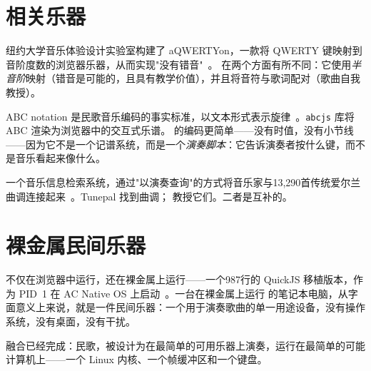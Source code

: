 \documentclass[11pt]{article}
\begin{document}
\section{相关乐器}

\begin{card}
纽约大学音乐体验设计实验室构建了 aQWERTYon，一款将 QWERTY 键映射到音阶度数的浏览器乐器，从而实现"没有错音"~\citep{hein2017aqwertyon}。\np{} 在两个方面有所不同：它使用\emph{半音阶}映射（错音是可能的，且具有教学价值），并且将音符与歌词配对（歌曲自我教授）。
\end{card}

\begin{card}
ABC notation 是民歌音乐编码的事实标准，以文本形式表示旋律~\citep{walshaw2011abc}。\texttt{abcjs} 库将 ABC 渲染为浏览器中的交互式乐谱。\np{} 的编码更简单——没有时值，没有小节线——因为它不是一个记谱系统，而是一个\emph{演奏脚本}：它告诉演奏者按什么键，而不是音乐看起来像什么。
\end{card}

\begin{card}
一个音乐信息检索系统，通过"以演奏查询"的方式将音乐家与13,290首传统爱尔兰曲调连接起来~\citep{duggan2009tunepal}。Tunepal 找到曲调；\np{} 教授它们。二者是互补的。
\end{card}

\section{裸金属民间乐器}

\np{} 不仅在浏览器中运行，还在裸金属上运行——一个987行的 QuickJS 移植版本，作为 PID~1 在 AC Native OS 上启动~\citep{scudder2026os}。一台在裸金属上运行 \np{} 的笔记本电脑，从字面意义上来说，就是一件民间乐器：一个用于演奏歌曲的单一用途设备，没有操作系统，没有桌面，没有干扰。

\begin{accentcard}
融合已经完成：民歌，被设计为在最简单的可用乐器上演奏，运行在最简单的可能计算机上——一个 Linux 内核、一个帧缓冲区和一个键盘。
\end{accentcard}

\end{document}

